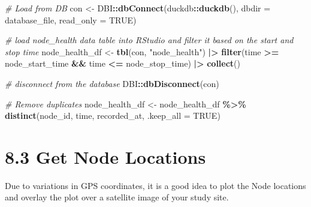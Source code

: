 \documentclass[
]{book}
\newenvironment{Shaded}{\begin{snugshade}}{\end{snugshade}}
\newcommand{\AttributeTok}[1]{\textcolor[rgb]{0.13,0.29,0.53}{#1}}
\newcommand{\CommentTok}[1]{\textcolor[rgb]{0.56,0.35,0.01}{\textit{#1}}}
\newcommand{\ConstantTok}[1]{\textcolor[rgb]{0.56,0.35,0.01}{#1}}
\newcommand{\FunctionTok}[1]{\textcolor[rgb]{0.13,0.29,0.53}{\textbf{#1}}}
\newcommand{\NormalTok}[1]{#1}
\newcommand{\OtherTok}[1]{\textcolor[rgb]{0.56,0.35,0.01}{#1}}
\newcommand{\SpecialCharTok}[1]{\textcolor[rgb]{0.81,0.36,0.00}{\textbf{#1}}}
\newcommand{\StringTok}[1]{\textcolor[rgb]{0.31,0.60,0.02}{#1}}
\begin{document}
\begin{Shaded}
\begin{Highlighting}[]
\CommentTok{\# Load from DB}
\NormalTok{con }\OtherTok{\textless{}{-}}\NormalTok{ DBI}\SpecialCharTok{::}\FunctionTok{dbConnect}\NormalTok{(duckdb}\SpecialCharTok{::}\FunctionTok{duckdb}\NormalTok{(), }
                      \AttributeTok{dbdir =}\NormalTok{ database\_file, }
                      \AttributeTok{read\_only =} \ConstantTok{TRUE}\NormalTok{)}

\CommentTok{\# load node\_health data table into RStudio and filter it based on the start and stop time}
\NormalTok{node\_health\_df }\OtherTok{\textless{}{-}} \FunctionTok{tbl}\NormalTok{(con, }\StringTok{"node\_health"}\NormalTok{) }\SpecialCharTok{|\textgreater{}}
  \FunctionTok{filter}\NormalTok{(time }\SpecialCharTok{\textgreater{}=}\NormalTok{ node\_start\_time }\SpecialCharTok{\&\&}\NormalTok{ time }\SpecialCharTok{\textless{}=}\NormalTok{ node\_stop\_time) }\SpecialCharTok{|\textgreater{}}
  \FunctionTok{collect}\NormalTok{()}

\CommentTok{\# disconnect from the database}
\NormalTok{DBI}\SpecialCharTok{::}\FunctionTok{dbDisconnect}\NormalTok{(con)}

\CommentTok{\# Remove duplicates}
\NormalTok{node\_health\_df }\OtherTok{\textless{}{-}}\NormalTok{ node\_health\_df }\SpecialCharTok{\%\textgreater{}\%} 
  \FunctionTok{distinct}\NormalTok{(node\_id, }
\NormalTok{           time, }
\NormalTok{           recorded\_at, }
           \AttributeTok{.keep\_all =} \ConstantTok{TRUE}\NormalTok{)}
\end{Highlighting}
\end{Shaded}

\section{8.3 Get Node Locations}\label{get-node-locations-1}

Due to variations in GPS coordinates, it is a good idea to plot the Node locations and overlay the plot over a satellite image of your study site.
\end{document}
